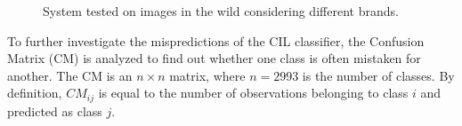 \begin{figure}[H]
	\centering
    \qquad
    \caption{System tested on images in the wild considering different brands.}
	\label{fig:test-final}
\end{figure}

To further investigate the mispredictions of the CIL classifier, the Confusion Matrix (CM) is analyzed to find out whether one class is often mistaken for another.
The CM is an $n \times n$ matrix, where $n = 2993$ is the number of classes.
By definition, $CM_{ij}$ is equal to the number of observations belonging to class $i$ and predicted as class $j$.


